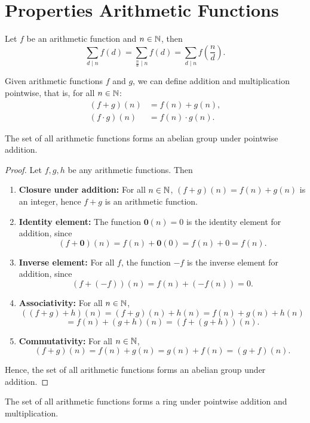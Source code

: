 \section{Properties Arithmetic Functions}
Let $f$ be an arithmetic function and $n \in \mathbb{N}$, then \[\sum_{d \mid n}f(d) = \sum_{\frac{n}{d} \mid n}f(d) = \sum_{d \mid n}f\left(\frac{n}{d}\right).\]

Given arithmetic functions $f$ and $g$, we can define addition and multiplication pointwise, that is, for all $n \in \mathbb{N}$:
\begin{align*}
    (f + g)(n) &= f(n) + g(n), \\
    (f \cdot g)(n) &= f(n) \cdot g(n).
\end{align*}
\begin{prop}\label{prop:addarthfunc}
    The set of all arithmetic functions forms an abelian group under pointwise addition.
\end{prop}
\begin{proof}
    Let $f, g, h$ be any arithmetic functions. Then
    \begin{enumerate}
        \item \textbf{Closure under addition:} For all $n \in \mathbb{N}$, $(f + g)(n) = f(n) + g(n)$ is an integer, hence $f + g$ is an arithmetic function.
        \item \textbf{Identity element:} The function $\mathbf{0}(n) = 0$ is the identity element for addition, since \[(f + \mathbf{0})(n) = f(n) + \mathbf{0}(0) = f(n) + 0 = f(n).\] 
        \item \textbf{Inverse element:} For all $f$, the function $-f$ is the inverse element for addition, since \[(f + (-f))(n) = f(n) + (-f(n)) = 0.\]
        \item \textbf{Associativity:} For all $n \in \mathbb{N}$,
        \[((f+g)+h)(n) = (f+g)(n) + h(n)= f(n) + g(n) + h(n) \]\[= f(n) + (g+h)(n) = (f+(g+h))(n).\]
        \item \textbf{Commutativity:} For all $n \in \mathbb{N}$, \[(f + g)(n) = f(n) + g(n) = g(n) + f(n) = (g + f)(n).\]
    \end{enumerate}
    Hence, the set of all arithmetic functions forms an abelian group under addition.
\end{proof}
\begin{prop}
    The set of all arithmetic functions forms a ring under pointwise addition and multiplication.
\end{prop}

